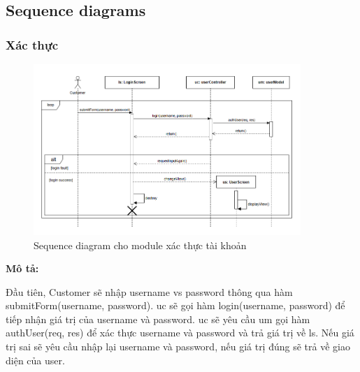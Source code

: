 \subsection{Sequence diagrams}
\subsubsection{Xác thực}
\begin{figure}[H]
    \begin{center}
        \includegraphics[width=0.9\textwidth]{Images/System Modelling/Authen_Sequence.png}
        \caption{Sequence diagram cho module xác thực tài khoản}
    \end{center}
\end{figure}
\textbf{Mô tả: }\par
Đầu tiên, Customer sẽ nhập username vs password thông qua hàm submitForm(username, password). uc sẽ gọi hàm login(username, password) để tiếp nhận giá trị của username và password. uc sẽ yêu cầu um gọi hàm authUser(req, res) để xác thực username và password và trả giá trị về ls.
Nếu giá trị sai sẽ yêu cầu nhập lại username và password, nếu giá trị đúng sẽ trả về giao diện của user.


